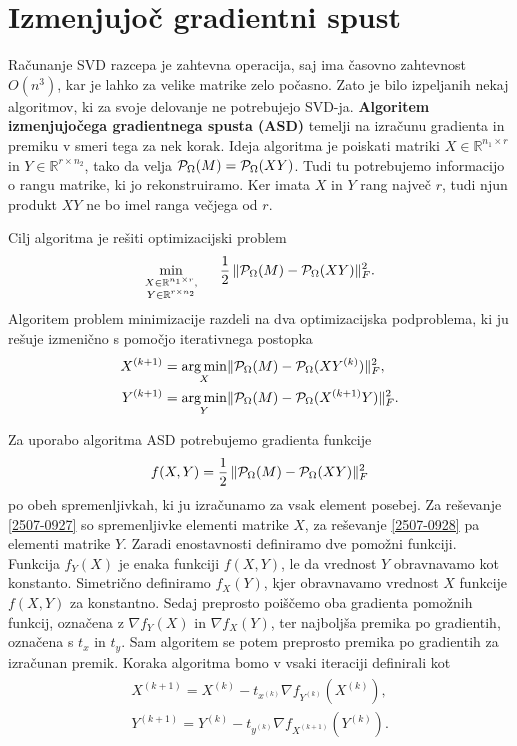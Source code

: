 \section{Izmenjujoč gradientni spust} \label{2707-1337}
Računanje SVD razcepa je zahtevna operacija, saj ima časovno zahtevnost
$O(n^3)$, kar je lahko za velike matrike zelo počasno. Zato je bilo izpeljanih nekaj algoritmov, ki za svoje delovanje ne potrebujejo SVD-ja. \textbf{Algoritem izmenjujočega gradientnega spusta (ASD)} \cite{AST-TK15} 
temelji na izračunu gradienta in premiku
v smeri tega za nek korak. Ideja algoritma je poiskati matriki $X \in \mathbb{R}^{n_1 \times r}$ in $Y \in \mathbb{R}^{r \times n_2}$, tako da velja $\mathcal{P}_\Omega(M) = \mathcal{P}_\Omega(XY)$. Tudi tu potrebujemo informacijo o rangu matrike, ki jo rekonstruiramo. Ker imata $X$ in $Y$ rang največ $r$, tudi njun produkt $XY$ ne bo imel ranga večjega od $r$. 

Cilj algoritma je rešiti optimizacijski problem
\[
    \min_{\substack{X\in \mathbb{R}^{n_1 \times r}, \\Y \in \mathbb{R}^{r \times n_2}}} \hspace{0.5cm} \frac{1}{2}\, \lVert\mathcal{P}_\Omega(M) - \mathcal{P}_\Omega(XY)\rVert_F^2.
\] 
Algoritem problem minimizacije razdeli na dva optimizacijska podproblema, ki ju rešuje izmenično s pomočjo iterativnega postopka
\begin{align}
\label{2507-0927}
    X^{(k+1)} &= \operatorname*{arg\,min}_{X} \lVert\mathcal{P}_\Omega(M) - \mathcal{P}_\Omega(XY^{(k)})\rVert_F^2, \\
\label{2507-0928}
    Y^{(k+1)} &= \operatorname*{arg\,min}_{Y} \lVert\mathcal{P}_\Omega(M) - \mathcal{P}_\Omega(X^{(k+1)}Y)\rVert_F^2.
\end{align}


Za uporabo algoritma ASD potrebujemo gradienta funkcije 
    $$f(X,Y) = \frac{1}{2}\, \lVert\mathcal{P}_\Omega(M) - \mathcal{P}_\Omega(XY)\rVert_F^2$$ 
po obeh spremenljivkah, ki ju izračunamo za vsak element posebej.
Za reševanje \eqref{2507-0927} so spremenljivke elementi matrike $X$,
za reševanje \eqref{2507-0928} pa elementi matrike $Y$. Zaradi enostavnosti definiramo dve pomožni funkciji. Funkcija $f_Y(X)$ je enaka funkciji $f(X, Y)$, le da vrednost $Y$ obravnavamo kot konstanto. Simetrično definiramo $f_X(Y)$, kjer obravnavamo vrednost $X$ funkcije $f(X, Y)$ za konstantno. Sedaj preprosto poiščemo oba gradienta pomožnih funkcij, označena z $\nabla f_Y(X)$ in $\nabla f_X(Y)$, ter najboljša premika po gradientih, označena s $t_x$ in $t_y$. Sam algoritem se potem preprosto premika po gradientih za izračunan premik. Koraka algoritma bomo v vsaki iteraciji definirali kot
\begin{align}
    \begin{split} \label{2607-1726}
    X^{(k+1)} = X^{(k)} - t_{x^{(k)}} \nabla f_{Y^{(k)}}(X^{(k)}), \\[0.2em]
    Y^{(k+1)} = Y^{(k)} - t_{y^{(k)}} \nabla f_{X^{(k+1)}}(Y^{(k)}).
    \end{split}
\end{align}

